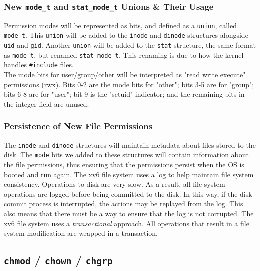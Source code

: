\documentclass[11pt,letterpaper]{report}
\begin{document}
	\subsubsection{New {\tt mode\_t} and {\tt stat\_mode\_t} Unions \& Their Usage}
	Permission modes will be represented as bits, and defined as a {\tt union}, called {\tt mode\_t}.
	This {\tt union} will be added to the {\tt inode} and {\tt dinode} structures alongside {\tt uid} and {\tt gid}.
	Another {\tt union} will be added to the {\tt stat} structure, the same format as {\tt mode\_t}, but renamed {\tt stat\_mode\_t}. This renaming is due to how the kernel handles {\tt \#include} files.\\
	The mode bits for user/group/other will be interpreted as "read write execute" permissions (rwx). Bits 0-2 are the mode bits for "other"; bits 3-5 are for "group"; bits 6-8 are for "user"; bit 9 is the "setuid" indicator; and the remaining bits in the integer field are unused.
	
	\subsubsection{Persistence of New File Permissions}
	The {\tt inode} and {\tt dinode} structures will maintain metadata about files stored to the disk. The {\tt mode} bits we added to these structures will contain information about the file permissions, thus ensuring that the permissions persist when the OS is booted and run again.
	The xv6 file system uses a log to help maintain file system consistency. Operations to disk are very slow. As a result, all file system operations are logged before being committed to the disk. In this way, if the disk commit process is interrupted, the actions may be replayed from the log. This also means that there must be a way to ensure that the log is not corrupted. The xv6 file system uses a \emph{transactional} approach. All operations that result in a file system modification are wrapped in a transaction. 
	
	\subsection{{\tt chmod} / {\tt chown} / {\tt chgrp}}
	
\end{document}
